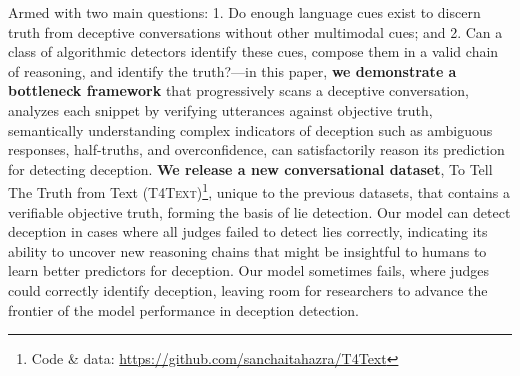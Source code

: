 Armed with two main questions: 1. Do enough language cues exist to discern truth from deceptive conversations without other multimodal cues; and 2. Can a class of algorithmic detectors identify these cues, compose them in a valid chain of reasoning, and identify the truth?---in this paper,
\textbf{we demonstrate a bottleneck framework} that progressively scans a deceptive conversation, analyzes each snippet by verifying utterances against objective truth, semantically understanding complex indicators of deception such as ambiguous responses, half-truths, and overconfidence, can satisfactorily reason its prediction for detecting deception. \textbf{We release a new conversational dataset}, To Tell The Truth from Text (\textsc{T4Text})\footnote{Code \& data: \url{https://github.com/sanchaitahazra/T4Text}}, unique to the previous datasets, that contains a verifiable objective truth, forming the basis of lie detection. Our model can detect deception in cases where all judges failed to detect lies correctly, indicating its ability to uncover new reasoning chains that might be insightful to humans to learn better predictors for deception. Our model sometimes fails, where judges could correctly identify deception, leaving room for researchers to advance the frontier of the model performance in deception detection.